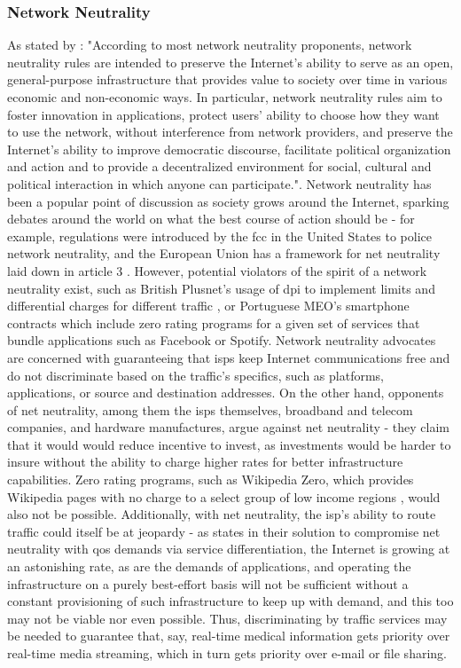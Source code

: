 \subsubsection{Network Neutrality}
    As stated by \cite{qos-framework}: "According to most network neutrality proponents, network neutrality rules are intended to preserve the Internet's ability to serve as an open, general-purpose infrastructure that provides value to society over time in various economic and non-economic ways. In particular, network neutrality rules aim to foster innovation in applications, protect users' ability to choose how they want to use the network, without interference from network providers, and preserve the Internet's ability to improve democratic discourse, facilitate political organization and action and to provide a decentralized environment for social, cultural and political interaction in which anyone can participate.".
    Network neutrality has been a popular point of discussion as society grows around the Internet, sparking debates around the world on what the best course of action should be - for example, regulations were introduced by the \gls{fcc} in the United States \cite{fcc} to police network neutrality, and the European Union has a framework for net neutrality laid down in article 3 \cite{article-3}. 
    However, potential violators of the spirit of a network neutrality exist, such as British Plusnet's usage of \gls{dpi} to implement limits and differential charges for different traffic \cite{arstechnica}, or Portuguese MEO's smartphone contracts which include zero rating programs for a given set of services \cite{meo-packages} that bundle applications such as Facebook or Spotify. 
    Network neutrality advocates are concerned with guaranteeing that \glspl{isp} keep Internet communications free and do not discriminate based on the traffic's specifics, such as platforms, applications, or source and destination addresses.
    On the other hand, opponents of net neutrality, among them the \glspl{isp} themselves, broadband and telecom companies, and hardware manufactures, argue against net neutrality - they claim that it would would reduce incentive to invest, as investments would be harder to insure without the ability to charge higher rates for better infrastructure capabilities.
    Zero rating programs, such as Wikipedia Zero, which provides Wikipedia pages with no charge to a select group of low income regions  , would also not be possible. 
    Additionally, with net neutrality, the \gls{isp}'s ability to route traffic could itself be at jeopardy - as \cite{jerzy} states in their solution to compromise net neutrality with \gls{qos} demands via service differentiation, the Internet is growing at an astonishing rate, as are the demands of applications, and operating the infrastructure on a purely best-effort basis will not be sufficient without a constant provisioning of such infrastructure to keep up with demand, and this too may not be viable nor even possible. 
    Thus, discriminating by traffic services may be needed to guarantee that, say, real-time medical information gets priority over real-time media streaming, which in turn gets priority over e-mail or file sharing.

